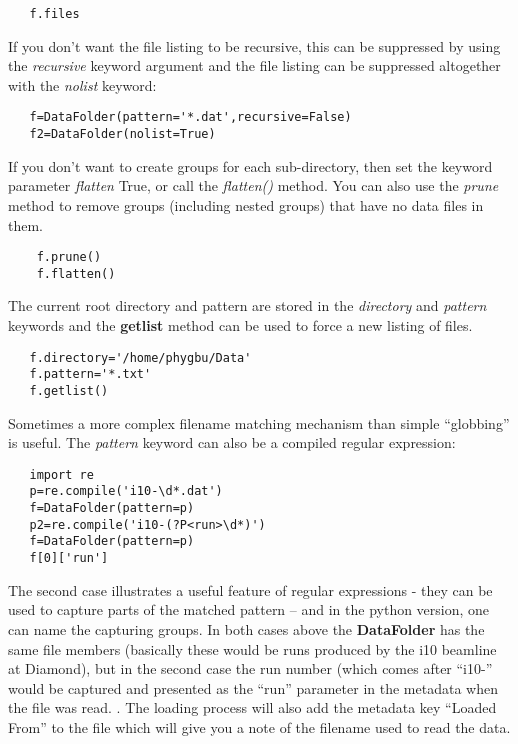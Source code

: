 \documentclass[a4paper,11pt]{scrartcl}
\begin{document}
\begin{lstlisting}
   f.files
\end{lstlisting}


If you don't want the file listing to be recursive, this can be suppressed by using the \textit{recursive} keyword argument and the file listing can be suppressed altogether with the \textit{nolist} keyword:

\begin{lstlisting}
   f=DataFolder(pattern='*.dat',recursive=False)
   f2=DataFolder(nolist=True)
\end{lstlisting}

If you don't want to create groups for each sub-directory, then set the keyword parameter \textit{flatten} True, or call the \textit{flatten()} method. You can also use the \textit{prune} method to remove groups (including nested groups) that have no data files in them.

\begin{lstlisting}
	f.prune()
	f.flatten()
\end{lstlisting}

The current root directory and pattern are stored in the \textit{directory} and \textit{pattern} keywords and the \textbf{getlist} method can be used to force a new listing of files.

\begin{lstlisting}
   f.directory='/home/phygbu/Data'
   f.pattern='*.txt'
   f.getlist()
\end{lstlisting}

Sometimes a more complex filename matching mechanism than simple ``globbing'' is useful. The \textit{pattern} keyword can also be a compiled regular expression:

\begin{lstlisting}
   import re
   p=re.compile('i10-\d*.dat')
   f=DataFolder(pattern=p)
   p2=re.compile('i10-(?P<run>\d*)')
   f=DataFolder(pattern=p)
   f[0]['run']
\end{lstlisting}

The second case illustrates a useful feature of regular expressions - they can be used to capture parts of the matched pattern -- and in the python version, one can name the capturing groups. In both cases above the \textbf{DataFolder} has the same file members (basically these would be runs produced by the i10 beamline at Diamond), but in the second case the run number (which comes after ``i10-'' would be captured and presented as the ``run'' parameter in the metadata when the file was read. . The loading process will also add the metadata key ``Loaded From'' to the file which will give you a note of the filename used to read the data.
\end{document}
